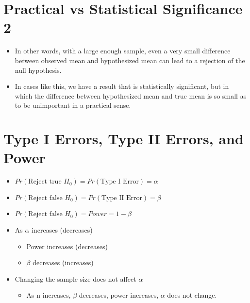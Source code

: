 \documentclass[12pt]{article}
\begin{document}
\section{Practical vs Statistical Significance
2}\label{practical-vs-statistical-significance-2}

\begin{itemize}
\itemsep1pt\parskip0pt
\item
  In other words, with a large enough sample, even a very small
  difference between observed mean and hypothesized mean can lead to a
  rejection of the null hypothesis.
\item
  In cases like this, we have a result that is statistically
  significant, but in which the difference between hypothesized mean and
  true mean is so small as to be unimportant in a practical sense.
\end{itemize}

\section{Type I Errors, Type II Errors, and
Power}\label{type-i-errors-type-ii-errors-and-power}

\begin{itemize}
\itemsep1pt\parskip0pt
\item
  \(Pr(\mbox{Reject true } H_{0}) = Pr(\mbox{Type I Error}) = \alpha\)
\item
  \(Pr(\mbox{Reject false } H_{0}) = Pr(\mbox{Type II Error}) = \beta\)
\item
  \(Pr(\mbox{Reject false } H_{0}) = Power = 1 - \beta\)
\item
  As \(\alpha\) increases (decreases)

  \begin{itemize}
  \itemsep1pt\parskip0pt
  \item
    Power increases (decreases)
  \item
    \(\beta\) decreases (increases)
  \end{itemize}
\item
  Changing the sample size does not affect \(\alpha\)

  \begin{itemize}
  \itemsep1pt\parskip0pt
  \item
    As n increases, \(\beta\) decreases, power increases, \(\alpha\)
    does not change.
  \end{itemize}
\end{itemize}
\end{document}

